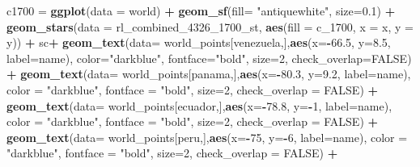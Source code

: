 \documentclass[12pt,oneside]{reedthesis}
\newenvironment{Shaded}{\begin{snugshade}}{\end{snugshade}}
\newcommand{\DataTypeTok}[1]{\textcolor[rgb]{0.13,0.29,0.53}{#1}}
\newcommand{\DecValTok}[1]{\textcolor[rgb]{0.00,0.00,0.81}{#1}}
\newcommand{\FloatTok}[1]{\textcolor[rgb]{0.00,0.00,0.81}{#1}}
\newcommand{\KeywordTok}[1]{\textcolor[rgb]{0.13,0.29,0.53}{\textbf{#1}}}
\newcommand{\NormalTok}[1]{#1}
\newcommand{\OperatorTok}[1]{\textcolor[rgb]{0.81,0.36,0.00}{\textbf{#1}}}
\newcommand{\OtherTok}[1]{\textcolor[rgb]{0.56,0.35,0.01}{#1}}
\newcommand{\StringTok}[1]{\textcolor[rgb]{0.31,0.60,0.02}{#1}}
\begin{document}
\begin{Shaded}
\begin{Highlighting}[]
\NormalTok{c1700 =}\StringTok{ }\KeywordTok{ggplot}\NormalTok{(}\DataTypeTok{data =}\NormalTok{ world) }\OperatorTok{+}\StringTok{ }
\StringTok{  }\KeywordTok{geom_sf}\NormalTok{(}\DataTypeTok{fill=} \StringTok{"antiquewhite"}\NormalTok{, }\DataTypeTok{size=}\FloatTok{0.1}\NormalTok{) }\OperatorTok{+}\StringTok{ }
\StringTok{  }\KeywordTok{geom_stars}\NormalTok{(}\DataTypeTok{data =}\NormalTok{ rl_combined_}\DecValTok{4326}\NormalTok{_}\DecValTok{1700}\NormalTok{_st, }\KeywordTok{aes}\NormalTok{(}\DataTypeTok{fill =}\NormalTok{ c_}\DecValTok{1700}\NormalTok{, }\DataTypeTok{x =}\NormalTok{ x, }\DataTypeTok{y =}\NormalTok{ y)) }\OperatorTok{+}\StringTok{ }
\StringTok{  }\NormalTok{sc}\OperatorTok{+}
\StringTok{  }\KeywordTok{geom_text}\NormalTok{(}\DataTypeTok{data=}\NormalTok{ world_points[venezuela,],}\KeywordTok{aes}\NormalTok{(}\DataTypeTok{x=}\OperatorTok{-}\FloatTok{66.5}\NormalTok{, }\DataTypeTok{y=}\FloatTok{8.5}\NormalTok{, }\DataTypeTok{label=}\NormalTok{name), }\DataTypeTok{color=}\StringTok{"darkblue"}\NormalTok{, }\DataTypeTok{fontface=}\StringTok{"bold"}\NormalTok{, }\DataTypeTok{size=}\DecValTok{2}\NormalTok{, }\DataTypeTok{check_overlap=}\OtherTok{FALSE}\NormalTok{) }\OperatorTok{+}
\StringTok{  }\KeywordTok{geom_text}\NormalTok{(}\DataTypeTok{data=}\NormalTok{ world_points[panama,],}\KeywordTok{aes}\NormalTok{(}\DataTypeTok{x=}\OperatorTok{-}\FloatTok{80.3}\NormalTok{, }\DataTypeTok{y=}\FloatTok{9.2}\NormalTok{, }\DataTypeTok{label=}\NormalTok{name), }\DataTypeTok{color =} \StringTok{"darkblue"}\NormalTok{, }\DataTypeTok{fontface =} \StringTok{"bold"}\NormalTok{, }\DataTypeTok{size=}\DecValTok{2}\NormalTok{, }\DataTypeTok{check_overlap =} \OtherTok{FALSE}\NormalTok{) }\OperatorTok{+}\StringTok{ }
\StringTok{  }\KeywordTok{geom_text}\NormalTok{(}\DataTypeTok{data=}\NormalTok{ world_points[ecuador,],}\KeywordTok{aes}\NormalTok{(}\DataTypeTok{x=}\OperatorTok{-}\FloatTok{78.8}\NormalTok{, }\DataTypeTok{y=}\OperatorTok{-}\DecValTok{1}\NormalTok{, }\DataTypeTok{label=}\NormalTok{name), }\DataTypeTok{color =} \StringTok{"darkblue"}\NormalTok{, }\DataTypeTok{fontface =} \StringTok{"bold"}\NormalTok{, }\DataTypeTok{size=}\DecValTok{2}\NormalTok{, }\DataTypeTok{check_overlap =} \OtherTok{FALSE}\NormalTok{) }\OperatorTok{+}
\StringTok{  }\KeywordTok{geom_text}\NormalTok{(}\DataTypeTok{data=}\NormalTok{ world_points[peru,],}\KeywordTok{aes}\NormalTok{(}\DataTypeTok{x=}\OperatorTok{-}\DecValTok{75}\NormalTok{, }\DataTypeTok{y=}\OperatorTok{-}\DecValTok{6}\NormalTok{, }\DataTypeTok{label=}\NormalTok{name), }\DataTypeTok{color =} \StringTok{"darkblue"}\NormalTok{, }\DataTypeTok{fontface =} \StringTok{"bold"}\NormalTok{, }\DataTypeTok{size=}\DecValTok{2}\NormalTok{, }\DataTypeTok{check_overlap =} \OtherTok{FALSE}\NormalTok{) }\OperatorTok{+}

\end{Highlighting}
\end{Shaded}
\end{document}
